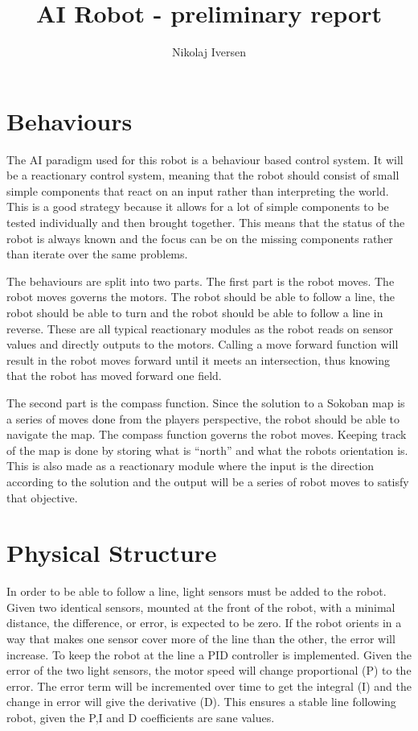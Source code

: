 \documentclass[a4paper,10pt]{article}
\title{AI Robot - preliminary report}
\author{Nikolaj Iversen}
\begin{document}
\maketitle

\section{Behaviours}
The AI paradigm used for this robot is a behaviour based control system.
It will be a reactionary control system, meaning that the robot should consist of small  simple components that react on an input rather than interpreting the world.
This is a good strategy because it allows for a lot of simple components to be tested individually and then brought together.
This means that the status of the robot is always known and the focus can be on the missing components rather than iterate over the same problems.

The behaviours are split into two parts.
The first part is the robot moves. 
The robot moves governs the motors. 
The robot should be able to follow a line, the robot should be able to turn and the robot should be able to follow a line in reverse.
These are all typical reactionary modules as the robot reads on sensor values and directly outputs to the motors.
Calling a move forward function will result in the robot moves forward until it meets an intersection, thus knowing that the robot has moved forward one field.

The second part is the compass function.
Since the solution to a Sokoban map is a series of moves done from the players perspective, the robot should be able to navigate the map.
The compass function governs the robot moves.
Keeping track of the map is done by storing what is ``north'' and what the robots orientation is.
This is also made as a reactionary module where the input is the direction according to the solution and the output will be a series of robot moves to satisfy that objective.

\section{Physical Structure}
In order to be able to follow a line, light sensors must be added to the robot. 
Given two identical sensors, mounted at the front of the robot, with a minimal distance, the difference, or error, is expected to be zero.
If the robot orients in a way that makes one sensor cover more of the line than the other, the error will increase.
To keep the robot at the line a PID controller is implemented.
Given the error of the two light sensors, the motor speed will change proportional (P) to the error.
The error term will be incremented over time to get the integral (I) and the change in error will give the derivative (D).
This ensures a stable line following robot, given the P,I and D coefficients are sane values.
\end{document}
